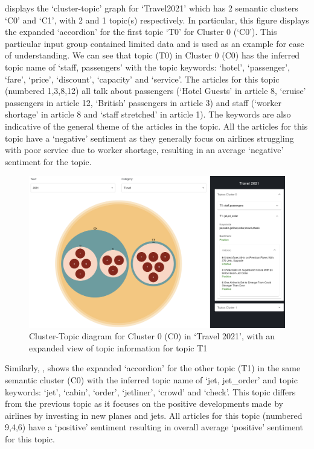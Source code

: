  displays the `cluster-topic' graph for `Travel2021' which has 2 semantic clusters `C0' and `C1', with 2 and 1 topic(s) respectively. In particular, this figure displays the expanded `accordion' for the first topic `T0' for Cluster 0 (`C0'). This particular input group contained limited data and is used as an example for ease of understanding. We can see that topic (T0) in Cluster 0 (C0) has the inferred topic name of `staff, passengers' with the topic keywords: `hotel', `passenger', `fare', `price', `discount', `capacity' and `service'. The articles for this topic (numbered 1,3,8,12) all talk about passengers (`Hotel Guests' in article 8, `cruise' passengers in article 12, `British' passengers in article 3) and staff (`worker shortage' in article 8 and `staff stretched' in article 1). The keywords are also indicative of the general theme of the articles in the topic. All the articles for this topic have a `negative' sentiment as they generally focus on airlines struggling with poor service due to worker shortage, resulting in an average `negative' sentiment for the topic.

\begin{figure}[H]
  \centering
  \includegraphics[width=0.99\linewidth]{images/travel2021_topics_1b.png}
  \caption{Cluster-Topic diagram for Cluster 0 (C0) in `Travel 2021', with an expanded view of topic information for topic T1}
  \label{fig:topics1b_travel2021}
\end{figure}

Similarly, , shows the expanded `accordion' for the other topic (T1) in the same semantic cluster (C0) with the inferred topic name of `jet, jet\_order' and topic keywords: `jet', `cabin', `order', `jetliner', `crowd' and `check'. This topic differs from the previous topic as it focuses on the positive developments made by airlines by investing in new planes and jets. All articles for this topic (numbered 9,4,6) have a `positive' sentiment resulting in overall average `positive' sentiment for this topic.


